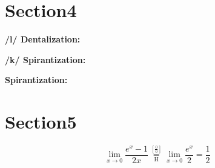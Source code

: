 \documentclass{article}
\begin{document}
\newline
\section{Section4}
\textbf{/l/ Dentalization:}
\vspace{3mm}
\newline
\newline
\begin{IPA}
\phonb{\phonfeat{\textipa{l}} }{[\textipa{\|[\textltilde}]}{}{\textipa{T}}
\vspace{3mm}
\newline
\newline
\end{IPA}
\textbf{/k/ Spirantization:}
\vspace{3mm}
\newline
\begin{IPA}
\end{IPA}
\vspace{3mm}
\newline
\newline
\textbf{Spirantization:}
\vspace{3mm}
\newline
\begin{IPA}
\end{IPA}
\vspace{3mm}
\newline
\section{Section5}
\[
 \lim_{x\to 0}{\frac{e^x-1}{2x}}
 \overset{\left[\frac{0}{0}\right]}{\underset{\mathrm{H}}{=}}
 \lim_{x\to 0}{\frac{e^x}{2}}={\frac{1}{2}}
\]
\end{document}
